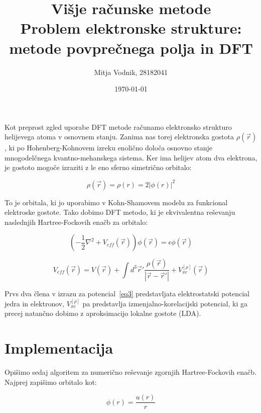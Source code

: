 \documentclass[a4paper]{article}
\newcommand{\half}{\frac{1}{2}}
\newcommand{\vr}{\vec{r}}
\begin{document}
    \title{\sc\large Višje računske metode\\
		\bigskip
		\bf\Large Problem elektronske strukture: metode povprečnega polja in DFT}
	\author{Mitja Vodnik, 28182041}
            \date{\today}
	\maketitle

    Kot preprost zgled uporabe DFT metode računamo elektronsko strukturo helijevega atoma v osnovnem stanju.
    Zanima nas torej elektronska gostota $\rho(\vr)$, ki po Hohenberg-Kohnovem izreku enolično določa osnovno
    stanje mnogodelčnega kvantno-mehanskega sistema.
    Ker ima helijev atom dva elektrona, je gostoto mogoče izraziti z le eno sferno simetrično orbitalo:

    \begin{equation}\label{eq1}
        \rho(\vr) = \rho(r) = 2|\phi(r)|^2
    \end{equation}

    To je orbitala, ki jo uporabimo v Kohn-Shamovem modelu za funkcional elektroske gostote.
    Tako dobimo DFT metodo, ki je ekvivalentna reševanju naslednjih Hartree-Fockovih enačb za orbitalo:

    \begin{equation}\label{eq2}
        \left( -\half \nabla^2 + V_{eff}(\vr) \right) \phi(\vr) = \epsilon \phi(\vr)
    \end{equation}

    \begin{equation}\label{eq3}
        V_{eff}(\vr) = V(\vr) + \int d^3\vr' \frac{\rho(\vr)}{|\vr - \vr'|} + V_{xc}^{[\rho]}(\vr)
    \end{equation}

    Prvs dva člena v izrazu za potencial~\ref{eq3} predstavljata elektrostatski potencial jedra in elektronov,
    $V_{xc}^{[\rho]}$ pa predstavlja izmenjalno-korelacijski potencial, ki ga precej natančno dobimo z aproksimacijo
    lokalne gostote (LDA).

    \section{Implementacija}

    Opišimo sedaj algoritem za numerično reševanje zgornjih Hartree-Fockovih enačb.
    Najprej zapišimo orbitalo kot:

    \begin{equation}\label{eq4}
        \phi(r) = \frac{u(r)}{r}
    \end{equation}
\end{document}
